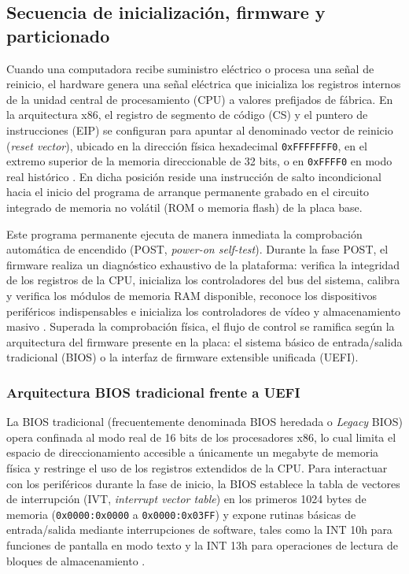 \documentclass[12pt]{article}
\begin{document}
\subsection{Secuencia de inicialización, firmware y particionado}
\label{sec:firmwareParticionado}

Cuando una computadora recibe suministro eléctrico o procesa una señal de reinicio, el hardware genera una señal eléctrica que inicializa los registros internos de la unidad central de procesamiento (CPU) a valores prefijados de fábrica. En la arquitectura x86, el registro de segmento de código (CS) y el puntero de instrucciones (EIP) se configuran para apuntar al denominado vector de reinicio (\textit{reset vector}), ubicado en la dirección física hexadecimal \texttt{0xFFFFFFF0}, en el extremo superior de la memoria direccionable de 32 bits, o en \texttt{0xFFFF0} en modo real histórico \parencite[\S 2.4.3, p.\ 76]{deitel2004operating}. En dicha posición reside una instrucción de salto incondicional hacia el inicio del programa de arranque permanente grabado en el circuito integrado de memoria no volátil (ROM o memoria flash) de la placa base.

Este programa permanente ejecuta de manera inmediata la comprobación automática de encendido (POST, \textit{power-on self-test}). Durante la fase POST, el firmware realiza un diagnóstico exhaustivo de la plataforma: verifica la integridad de los registros de la CPU, inicializa los controladores del bus del sistema, calibra y verifica los módulos de memoria RAM disponible, reconoce los dispositivos periféricos indispensables e inicializa los controladores de vídeo y almacenamiento masivo \parencite[\S 2.2, p.\ 40]{carretero2001sistemas}. Superada la comprobación física, el flujo de control se ramifica según la arquitectura del firmware presente en la placa: el sistema básico de entrada/salida tradicional (BIOS) o la interfaz de firmware extensible unificada (UEFI).

\subsubsection{Arquitectura BIOS tradicional frente a UEFI}

La BIOS tradicional (frecuentemente denominada BIOS heredada o \textit{Legacy} BIOS) opera confinada al modo real de 16 bits de los procesadores x86, lo cual limita el espacio de direccionamiento accesible a únicamente un megabyte de memoria física y restringe el uso de los registros extendidos de la CPU. Para interactuar con los periféricos durante la fase de inicio, la BIOS establece la tabla de vectores de interrupción (IVT, \textit{interrupt vector table}) en los primeros 1024 bytes de memoria (\texttt{0x0000:0x0000} a \texttt{0x0000:0x03FF}) y expone rutinas básicas de entrada/salida mediante interrupciones de software, tales como la INT 10h para funciones de pantalla en modo texto y la INT 13h para operaciones de lectura de bloques de almacenamiento \parencite[\S 2.2, p.\ 40]{carretero2001sistemas}. 
\end{document}
